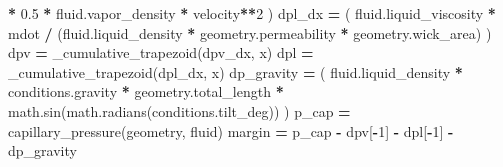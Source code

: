 \documentclass[
  12pt,a4paper,oneside]{report}
\newenvironment{Shaded}{\begin{snugshade}}{\end{snugshade}}
\newcommand{\DecValTok}[1]{\textcolor[rgb]{0.00,0.00,0.81}{#1}}
\newcommand{\FloatTok}[1]{\textcolor[rgb]{0.00,0.00,0.81}{#1}}
\newcommand{\NormalTok}[1]{#1}
\newcommand{\OperatorTok}[1]{\textcolor[rgb]{0.81,0.36,0.00}{\textbf{#1}}}
\begin{document}
\begin{Shaded}
\begin{Highlighting}[]
        \OperatorTok{*} \FloatTok{0.5} \OperatorTok{*}\NormalTok{ fluid.vapor\_density }\OperatorTok{*}\NormalTok{ velocity}\OperatorTok{**}\DecValTok{2}
\NormalTok{    )}
\NormalTok{    dpl\_dx }\OperatorTok{=}\NormalTok{ (}
\NormalTok{        fluid.liquid\_viscosity }\OperatorTok{*}\NormalTok{ mdot}
        \OperatorTok{/}\NormalTok{ (fluid.liquid\_density }\OperatorTok{*}\NormalTok{ geometry.permeability }\OperatorTok{*}\NormalTok{ geometry.wick\_area)}
\NormalTok{    )}
\NormalTok{    dpv }\OperatorTok{=}\NormalTok{ \_cumulative\_trapezoid(dpv\_dx, x)}
\NormalTok{    dpl }\OperatorTok{=}\NormalTok{ \_cumulative\_trapezoid(dpl\_dx, x)}
\NormalTok{    dp\_gravity }\OperatorTok{=}\NormalTok{ (}
\NormalTok{        fluid.liquid\_density }\OperatorTok{*}\NormalTok{ conditions.gravity }\OperatorTok{*}\NormalTok{ geometry.total\_length}
        \OperatorTok{*}\NormalTok{ math.sin(math.radians(conditions.tilt\_deg))}
\NormalTok{    )}
\NormalTok{    p\_cap }\OperatorTok{=}\NormalTok{ capillary\_pressure(geometry, fluid)}
\NormalTok{    margin }\OperatorTok{=}\NormalTok{ p\_cap }\OperatorTok{{-}}\NormalTok{ dpv[}\OperatorTok{{-}}\DecValTok{1}\NormalTok{] }\OperatorTok{{-}}\NormalTok{ dpl[}\OperatorTok{{-}}\DecValTok{1}\NormalTok{] }\OperatorTok{{-}}\NormalTok{ dp\_gravity}


\end{Highlighting}
\end{Shaded}
\end{document}
